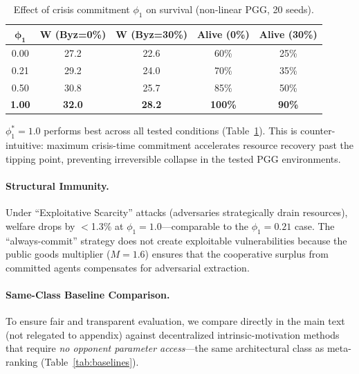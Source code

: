 \documentclass{article}
\begin{document}
\begin{table}[t]
\centering
\caption{Effect of crisis commitment $\phi_1$ on survival (non-linear PGG, 20 seeds).}
\label{tab:phi1}
\begin{tabular}{ccccc}
\toprule
$\boldsymbol{\phi_1}$ & \textbf{W (Byz=0\%)} & \textbf{W (Byz=30\%)} & \textbf{Alive (0\%)} & \textbf{Alive (30\%)} \\
\midrule
0.00 & 27.2 & 22.6 & 60\% & 25\% \\
0.21 & 29.2 & 24.0 & 70\% & 35\% \\
0.50 & 30.8 & 25.7 & 85\% & 50\% \\
\textbf{1.00} & \textbf{32.0} & \textbf{28.2} & \textbf{100\%} & \textbf{90\%} \\
\bottomrule
\end{tabular}
\end{table}

$\phi_1^* = 1.0$ performs best across all tested conditions (Table~\ref{tab:phi1}).
This is counter-intuitive: maximum crisis-time commitment accelerates resource recovery past the tipping point, preventing irreversible collapse in the tested PGG environments.

\paragraph{Structural Immunity.}
Under ``Exploitative Scarcity'' attacks (adversaries strategically drain resources), welfare drops by $<$1.3\% at $\phi_1 = 1.0$---comparable to the $\phi_1 = 0.21$ case.
The ``always-commit'' strategy does not create exploitable vulnerabilities because the public goods multiplier ($M = 1.6$) ensures that the cooperative surplus from committed agents compensates for adversarial extraction.

\paragraph{Same-Class Baseline Comparison.}
To ensure fair and transparent evaluation, we compare directly in the main text (not relegated to appendix) against decentralized intrinsic-motivation methods that require \emph{no opponent parameter access}---the same architectural class as meta-ranking (Table~\ref{tab:baselines}).
\end{document}
